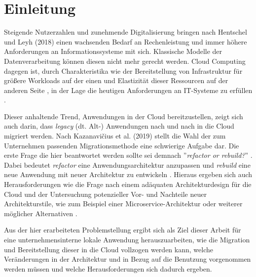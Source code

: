 \chapter{Einleitung}
Steigende Nutzerzahlen und zunehmende Digitalisierung bringen nach Hentschel und Leyh (2018) einen wachsenden Bedarf an Rechenleistung und immer höhere Anforderungen an Informationssysteme mit sich. Klassische Modelle der Datenverarbeitung können diesen nicht mehr gerecht werden. Cloud Computing dagegen ist, durch Charakteristika wie der Bereitstellung von Infrastruktur für größere Workloads auf der einen und Elastizität dieser Ressourcen auf der anderen Seite \cite[Vgl.][S. 2]{Mell2011}, in der Lage die heutigen Anforderungen an IT-Systeme zu erfüllen \cite[Vgl.][S. 6]{Reinheimer2018}.

Dieser anhaltende Trend, Anwendungen in der Cloud bereitzustellen, zeigt sich auch darin, dass \textit{legacy} (dt. Alt-) Anwendungen nach und nach in die Cloud migriert werden. Nach Kazanavičius et al. (2019) stellt die Wahl der zum Unternehmen passenden Migrationsmethode eine schwierige Aufgabe dar. Die erste Frage die hier beantwortet werden sollte sei demnach ''\textit{refactor or rebuild?}'' \cite[Vgl.][S. 4]{Kazanavicius2019}. Dabei bedeutet \textit{refactor} eine Anwendungsarchitektur anzupassen und \textit{rebuild} eine neue Anwendung mit neuer Architektur zu entwickeln \cite[Vgl.][S. 2]{Ahmad2018}. Hieraus ergeben sich auch Herausforderungen wie die Frage nach einem adäquaten Architekturdesign für die Cloud \cite[Vgl.][S. 14]{Pahl} und der Untersuchung potenzieller Vor- und Nachteile neuer Architekturstile, wie zum Beispiel einer Microservice-Architektur oder weiterer möglicher Alternativen \cite[Vgl.][S. 3]{Carrasco2018}.

Aus der hier erarbeiteten Problemstellung ergibt sich als Ziel dieser Arbeit für eine unternehmensinterne lokale Anwendung herauszuarbeiten, wie die Migration und Bereitstellung dieser in die Cloud vollzogen werden kann, welche Veränderungen in der Architektur und in Bezug auf die Benutzung vorgenommen werden müssen und welche Herausforderungen sich dadurch ergeben.

